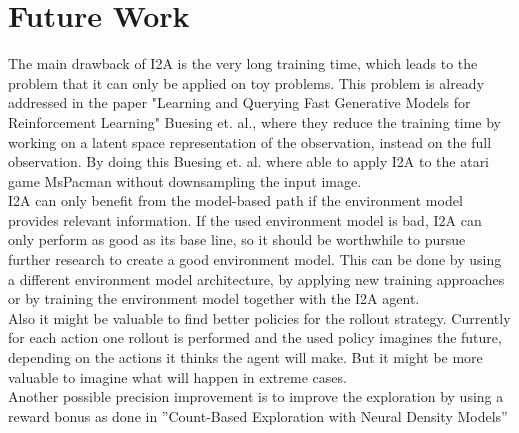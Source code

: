 \section{Future Work}

The main drawback of I2A is the very long training time, which leads to the problem that it can only be applied on toy problems. This problem is already addressed in the paper "Learning and Querying Fast Generative Models for Reinforcement Learning" \cite{LearningAndQueryingFasGenerativeModels} Buesing et. al., where they reduce the training time by working on a latent space representation of the observation, instead on the full observation. By doing this Buesing et. al. where able to apply I2A to the atari game MsPacman without downsampling the input image.\\


I2A can only benefit from the model-based path if the environment model provides relevant information. 
If the used environment model is bad, I2A can only perform as good as its base line, so it should be worthwhile to pursue further research to create a good environment model.
This can be done by using a different environment model architecture, by applying new training approaches or by training the environment model together with the I2A agent.\\

Also it might be valuable to find better policies for the rollout strategy. Currently for each action one rollout is performed and the used policy imagines the future, depending on the actions it thinks the agent will make. But it might be more valuable to imagine what will happen in extreme cases.\\

Another possible precision improvement is to improve the exploration by using a reward bonus as done in ”Count-Based Exploration with Neural Density Models” \cite{CountBasedExploration}



